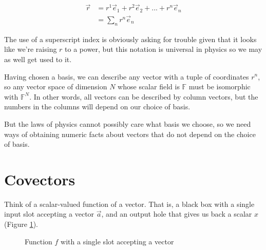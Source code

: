\begin{equation}
\begin{split}
\vec{r} &= r^1 \vec{e}_1 + r^2 \vec{e}_2 + ... + r^n \vec{e}_n \\
        &= \sum_n r^n \vec{e}_n
\end{split}
\end{equation}

The use of a superscript index is obviously asking for trouble given that it looks like we're raising $r$ to a power, but this notation is universal in physics so we may as well get used to it.

Having chosen a basis, we can describe any vector with a tuple of coordinates $r^n$, so any vector space of dimension $N$ whose scalar field is $\mathbb{F}$ must be isomorphic with $\mathbb{F}^N$. In other words, all vectors can be described by column vectors, but the numbers in the columns will depend on our choice of basis.

But the laws of physics cannot possibly care what basis we choose, so we need ways of obtaining numeric facts about vectors that do not depend on the choice of basis.

\section{Covectors}

Think of a scalar-valued function of a vector. That is, a black box with a single input slot accepting a vector $\vec{a}$, and an output hole that gives us back a scalar $x$ (Figure \ref{fig:1-slot-box}).

\begin{figure}[h]
    \centering
    \caption{Function $f$ with a single slot accepting a vector} \label{fig:1-slot-box}
\end{figure}

